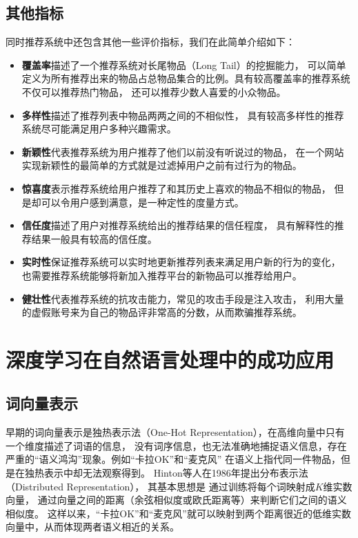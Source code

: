 \subsection{其他指标}
同时推荐系统中还包含其他一些评价指标，我们在此简单介绍如下：
\begin{itemize}
\item \textbf{覆盖率}描述了一个推荐系统对长尾物品（Long Tail）的挖掘能力，
可以简单定义为所有推荐出来的物品占总物品集合的比例。具有较高覆盖率的推荐系统不仅可以推荐热门物品，
还可以推荐少数人喜爱的小众物品。
\item \textbf{多样性}描述了推荐列表中物品两两之间的不相似性，
具有较高多样性的推荐系统尽可能满足用户多种兴趣需求。
\item \textbf{新颖性}代表推荐系统为用户推荐了他们以前没有听说过的物品，
在一个网站实现新颖性的最简单的方式就是过滤掉用户之前有过行为的物品。
\item \textbf{惊喜度}表示推荐系统给用户推荐了和其历史上喜欢的物品不相似的物品，
但是却可以令用户感到满意，是一种定性的度量方式。
\item \textbf{信任度}描述了用户对推荐系统给出的推荐结果的信任程度，
具有解释性的推荐结果一般具有较高的信任度。
\item \textbf{实时性}保证推荐系统可以实时地更新推荐列表来满足用户新的行为的变化，
也需要推荐系统能够将新加入推荐平台的新物品可以推荐给用户。
\item \textbf{健壮性}代表推荐系统的抗攻击能力，常见的攻击手段是注入攻击，
利用大量的虚假账号来为自己的物品评非常高的分数，从而欺骗推荐系统。
\end{itemize}

\section{深度学习在自然语言处理中的成功应用}
\subsection{词向量表示}
早期的词向量表示是独热表示法（One-Hot Representation），在高维向量中只有一个维度描述了词语的信息，
没有词序信息，也无法准确地捕捉语义信息，存在严重的``语义鸿沟''现象。例如``卡拉OK''和``麦克风''
在语义上指代同一件物品，但是在独热表示中却无法观察得到。
Hinton等人\parencite{hinton1986learning}在1986年提出分布表示法（Distributed Representation），
其基本思想是 通过训练将每个词映射成$K$维实数向量，
通过向量之间的距离（余弦相似度或欧氏距离等）来判断它们之间的语义相似度。
这样以来，``卡拉OK''和``麦克风''就可以映射到两个距离很近的低维实数向量中，从而体现两者语义相近的关系。

